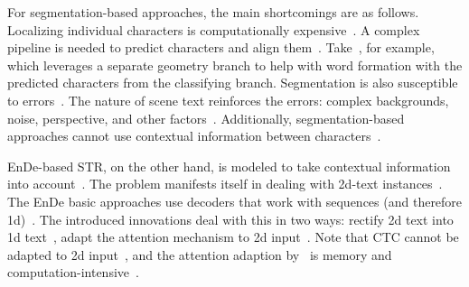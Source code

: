 For segmentation-based approaches, the main shortcomings are as follows.
Localizing individual characters is computationally expensive~\citep{zhan_esir_2019}.
A complex pipeline is needed to predict characters and align them~\citep{liu_abcnet_2020}.
Take~\cite{wan_textscanner_2020}, for example, which leverages a separate geometry branch
to help with word formation with the predicted characters from the classifying branch.
Segmentation is also susceptible to errors~\citep{zhan_esir_2019,cheng_aon_2018,chen_text_2021}.
The nature of scene text reinforces the errors: complex backgrounds, noise, perspective,
and other factors~\citep{hu_gtc_2020,chen_text_2021,baek_what_2019}.
Additionally, segmentation-based approaches cannot use contextual information between
characters~\citep{chen_text_2021}.

\ac{EnDe}-based \ac{STR}, on the other hand, is modeled to take contextual information into
account~\citep{long_scene_2021,chen_text_2021}.
The problem manifests itself in dealing with 2d-text
instances~\citep{long_scene_2021,liao_scene_2018}.
The \ac{EnDe} basic approaches use decoders that work with sequences (and therefore
1d)~\citep{long_scene_2021,cheng_aon_2018}.
The introduced innovations deal with this in two ways: rectify 2d text into 1d
text~\citep{zhan_esir_2019,luo_multi-object_2019,shi_aster_2019,liu_char-net_2018}, adapt the
attention mechanism to 2d input~\citep{li_show_2019}.
Note that \ac{CTC} cannot be adapted to 2d input~\citep{cheng_focusing_2017,xie_aggregation_2019},
and the attention adaption by~\cite{li_show_2019} is memory and
computation-intensive~\citep{xie_aggregation_2019}.

